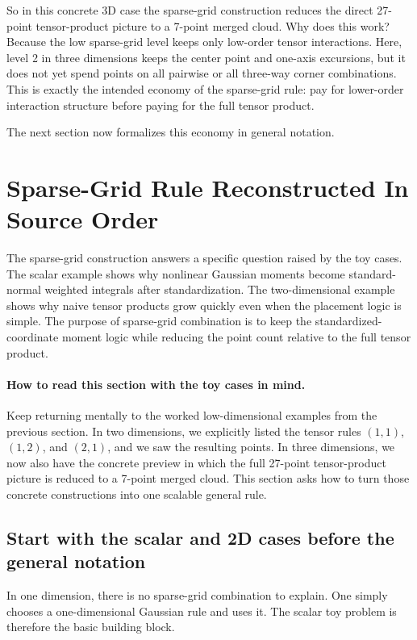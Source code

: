 \documentclass[11pt]{article}
\numberwithin{equation}{section}
\begin{document}
So in this concrete 3D case the sparse-grid construction reduces the direct
27-point tensor-product picture to a 7-point merged cloud.  Why does this work?
Because the low sparse-grid level keeps only low-order tensor interactions.
Here, level 2 in three dimensions keeps the center point and one-axis excursions,
but it does not yet spend points on all pairwise or all three-way corner
combinations.  This is exactly the intended economy of the sparse-grid rule: pay
for lower-order interaction structure before paying for the full tensor product.

The next section now formalizes this economy in general notation.

\section{Sparse-Grid Rule Reconstructed In Source Order}
\label{sec:p31-sgq-reconstruction}

The sparse-grid construction answers a specific question raised by the toy cases.
The scalar example shows why nonlinear Gaussian moments become standard-normal
weighted integrals after standardization.  The two-dimensional example shows why
naive tensor products grow quickly even when the placement logic is simple.  The
purpose of sparse-grid combination is to keep the standardized-coordinate moment
logic while reducing the point count relative to the full tensor product.

\paragraph{How to read this section with the toy cases in mind.}
Keep returning mentally to the worked low-dimensional examples from the previous
section.  In two dimensions, we explicitly listed the tensor rules
\((1,1)\), \((1,2)\), and \((2,1)\), and we saw the resulting points.  In three
dimensions, we now also have the concrete preview in which the full 27-point
tensor-product picture is reduced to a 7-point merged cloud.  This section asks
how to turn those concrete constructions into one scalable general rule.

\subsection{Start with the scalar and 2D cases before the general notation}

In one dimension, there is no sparse-grid combination to explain.  One simply
chooses a one-dimensional Gaussian rule and uses it.  The scalar toy problem is
therefore the basic building block.
\end{document}
